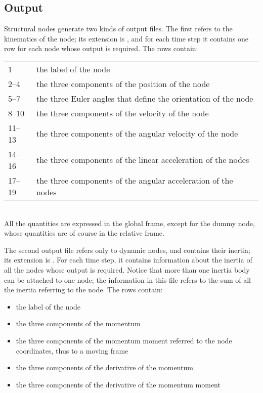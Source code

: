 \subsection{Output}
Structural nodes generate two kinds of output files. 
The first refers to the kinematics of the node; its extension is ,
and for each time step it contains one row for each node whose output is
required.
The rows contain: \vspace{2mm} \\
\begin{tabular}{ll}
	\hline
	1      & the label of the node \\
	2--4   & the three components of the position of the node \\
	5--7   & the three Euler angles that define the orientation of the node \\
	8--10  & the three components of the velocity of the node \\
	11--13 & the three components of the angular velocity of the node \\
	\hline
	14--16 & the three components of the linear acceleration
		of the \kw{dynamic} nodes \\
	17--19 & the three components of the angular acceleration
		of the \kw{dynamic} nodes \\
	\hline
\end{tabular}\vspace{2mm}\\
All the quantities are expressed in the global frame, except for
the dummy  node, whose quantities are of course
in the relative frame.

\noindent
The second output file refers only to dynamic nodes, and contains their
inertia; its extension is .
For each time step, it contains information about the inertia of all the
nodes whose output is required.
Notice that more than one inertia body can be attached to one node; the
information in this file refers to the sum of all the inertia referring to
the node.
The rows contain:
\begin{itemize}
    \item the label of the node
    \item the three components of the momentum
    \item the three components of the momentum moment referred to the node
    coordinates, thus to a moving frame
    \item the three components of the derivative of the momentum
    \item the three components of the derivative of the momentum moment
\end{itemize}


